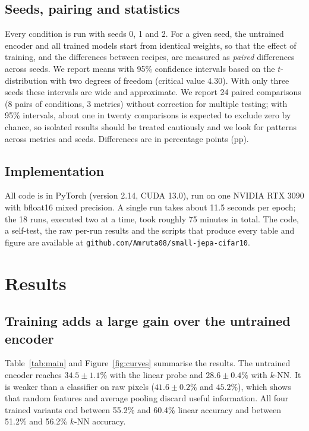 \documentclass[pdflatex,sn-basic]{sn-jnl}%
\begin{document}
\subsection{Seeds, pairing and statistics}\label{sec:stats}
Every condition is run with seeds 0, 1 and 2. For a given seed, the untrained encoder and all trained models start from identical weights, so that the effect of training, and the differences between recipes, are measured as \emph{paired} differences across seeds. We report means with 95\% confidence intervals based on the $t$-distribution with two degrees of freedom (critical value 4.30). With only three seeds these intervals are wide and approximate. We report 24 paired comparisons (8 pairs of conditions, 3 metrics) without correction for multiple testing; with 95\% intervals, about one in twenty comparisons is expected to exclude zero by chance, so isolated results should be treated cautiously and we look for patterns across metrics and seeds. Differences are in percentage points (pp).

\subsection{Implementation}\label{sec:impl}
All code is in PyTorch (version 2.14, CUDA 13.0), run on one NVIDIA RTX 3090 with bfloat16 mixed precision. A single run takes about 11.5 seconds per epoch; the 18 runs, executed two at a time, took roughly 75 minutes in total. The code, a self-test, the raw per-run results and the scripts that produce every table and figure are available at \texttt{github.com/Amruta08/\allowbreak small-jepa-cifar10}.

\section{Results}\label{sec:results}

\subsection{Training adds a large gain over the untrained encoder}\label{sec:res-training}
Table~\ref{tab:main} and Figure~\ref{fig:curves} summarise the results. The untrained encoder reaches $34.5\pm1.1\%$ with the linear probe and $28.6\pm0.4\%$ with $k$-NN. It is weaker than a classifier on raw pixels ($41.6\pm0.2\%$ and $45.2\%$), which shows that random features and average pooling discard useful information. All four trained variants end between 55.2\% and 60.4\% linear accuracy and between 51.2\% and 56.2\% $k$-NN accuracy.
\end{document}

